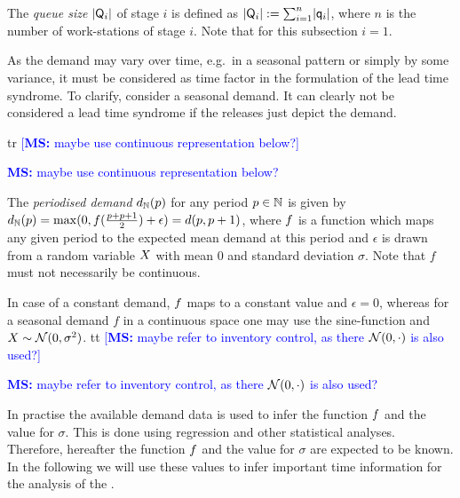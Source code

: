\documentclass[mnsc]{informs3}
\newcommand\MS[2][r]{\ifx t#1 \textcolor{blue}{[\textbf{MS:} #2]}
  \else \begin{center}\textcolor{blue}{\textbf{MS:} #2} \end{center} \fi}
\begin{document}
\begin{definition}

  The \emph{queue size} $\lvert{\mathsf{Q}_{i}}\rvert$ of stage $i$ is defined as
  $\lvert{\mathsf{Q}_{i}}\rvert \mathrel{:=} \sum_{i=1}^{n} \lvert{\mathsf{q}_{i}}\rvert$, where $n$ is the number of work-stations of stage
  $i$. Note that for this subsection $i=1$.

\end{definition}


As the demand may vary over time, e.g.~in a seasonal pattern or simply by some variance, it must be
considered as time factor in the formulation of the lead time syndrome. To clarify, consider a
seasonal demand. It can clearly not be considered a lead time syndrome if the releases just depict
the demand.

\MS{maybe use continuous representation below?}

\begin{definition}
  The \emph{periodised demand} ${d_{\mathbb{N}}}(p)$ for any period $p \in \mathbb{N}$ is given by
  ${d_{\mathbb{N}}}(p) = \max(0,{f}(\frac{p+p+1}{2}) + \epsilon) = {d}(p,p+1)$, where ${f}$ is a
  function which maps any given period to the expected mean demand at this period and $\epsilon$ is
  drawn from a random variable $X$ with mean $0$ and standard deviation $\sigma$. Note that $f$
  must not necessarily be continuous.
\end{definition}


\begin{example}
  In case of a constant demand, ${f}$ maps to a constant value and $\epsilon = 0$, whereas for a
  seasonal demand $f$ in a continuous space one may use the sine-function and
  $X \sim \mathcal{N}(0,\sigma^{2})$.
  \MS[t]{maybe refer to inventory control, as there $\mathcal{N}(0,\cdot)$ is also used?}

\end{example}

In practise the available demand data is used to infer the function ${f}$ and the value for
$\sigma$. This is done using regression and other statistical analyses. Therefore, hereafter the
function ${f}$ and the value for $\sigma$ %
are expected to be known. In the following we will use these values to infer important time
information for the analysis of the \LTS{}.
\end{document}
